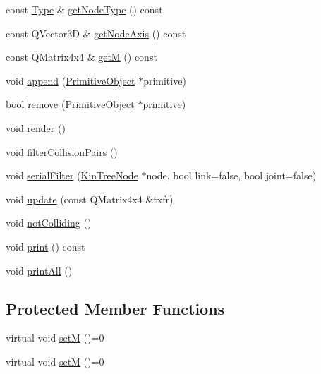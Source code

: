 \begin{DoxyCompactItemize}
\item 
const \hyperlink{class_robot_model_1_1_kin_tree_node_a6cc10fb82046bd1d9f61b806756ad176}{Type} \& \hyperlink{class_robot_model_1_1_kin_tree_node_aac3f58f3a0535b2983e2b328d9eee65a}{getNodeType} () const 
\item 
const QVector3D \& \hyperlink{class_robot_model_1_1_kin_tree_node_af6a4b3bd148bf6aba766c367e13d59b6}{getNodeAxis} () const 
\item 
const QMatrix4x4 \& \hyperlink{class_robot_model_1_1_kin_tree_node_a5c91c678cc74412ec298e61a39b47e3e}{getM} () const 
\item 
void \hyperlink{class_robot_model_1_1_kin_tree_node_ae488de9b7fc97fb20690f66fead07391}{append} (\hyperlink{class_robot_model_1_1_primitive_object}{PrimitiveObject} $\ast$primitive)
\item 
bool \hyperlink{class_robot_model_1_1_kin_tree_node_a9612cdc54c0a34148ca5350b19a1d385}{remove} (\hyperlink{class_robot_model_1_1_primitive_object}{PrimitiveObject} $\ast$primitive)
\item 
void \hyperlink{class_robot_model_1_1_kin_tree_node_a7ccf98213f418d0e5efa4f699d898f2d}{render} ()
\item 
void \hyperlink{class_robot_model_1_1_kin_tree_node_a560df50c25717025df7a4682968b7319}{filterCollisionPairs} ()
\item 
void \hyperlink{class_robot_model_1_1_kin_tree_node_ac1aaeb1bf262448d159f9648a190c167}{serialFilter} (\hyperlink{class_robot_model_1_1_kin_tree_node}{KinTreeNode} $\ast$node, bool link=false, bool joint=false)
\item 
void \hyperlink{class_robot_model_1_1_kin_tree_node_a035b82b85c6a5f54e027bc05684f1032}{update} (const QMatrix4x4 \&txfr)
\item 
void \hyperlink{class_robot_model_1_1_kin_tree_node_a08e95447cbb2963b03afbac17215aa00}{notColliding} ()
\item 
void \hyperlink{class_robot_model_1_1_kin_tree_node_ae59d71f257f19e074d6f88cd2dd3c710}{print} () const 
\item 
void \hyperlink{class_robot_model_1_1_kin_tree_node_ab3136d2833d86ee76b22066de34a562c}{printAll} ()
\end{DoxyCompactItemize}
\subsection*{Protected Member Functions}
\begin{DoxyCompactItemize}
\item 
virtual void \hyperlink{class_robot_model_1_1_kin_tree_node_a47574c65af53990455540547d8d00e9f}{setM} ()=0
\item 
virtual void \hyperlink{class_robot_model_1_1_kin_tree_node_a47574c65af53990455540547d8d00e9f}{setM} ()=0
\end{DoxyCompactItemize}
